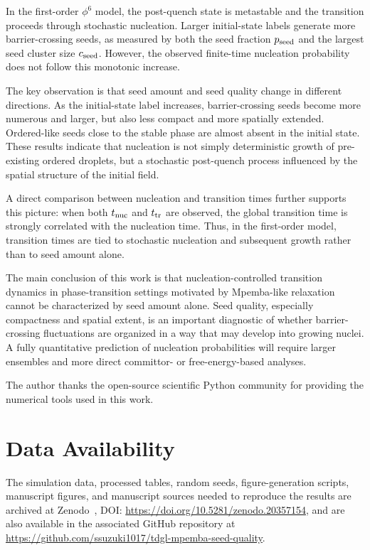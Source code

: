 ﻿\documentclass[aps,pre,preprint,showkeys,amsmath,amssymb,superscriptaddress,longbibliography]{revtex4-2}
\begin{document}
In the first-order $\phi^6$ model, the post-quench state is metastable and the transition proceeds through stochastic nucleation. Larger initial-state labels generate more barrier-crossing seeds, as measured by both the seed fraction $p_{\rm seed}$ and the largest seed cluster size $c_{\rm seed}$. However, the observed finite-time nucleation probability does not follow this monotonic increase.

The key observation is that seed amount and seed quality change in different directions. As the initial-state label increases, barrier-crossing seeds become more numerous and larger, but also less compact and more spatially extended. Ordered-like seeds close to the stable phase are almost absent in the initial state. These results indicate that nucleation is not simply deterministic growth of pre-existing ordered droplets, but a stochastic post-quench process influenced by the spatial structure of the initial field.

A direct comparison between nucleation and transition times further supports this picture: when both $t_{\rm nuc}$ and $t_{\rm tr}$ are observed, the global transition time is strongly correlated with the nucleation time. Thus, in the first-order model, transition times are tied to stochastic nucleation and subsequent growth rather than to seed amount alone.

The main conclusion of this work is that nucleation-controlled transition dynamics in phase-transition settings motivated by Mpemba-like relaxation cannot be characterized by seed amount alone. Seed quality, especially compactness and spatial extent, is an important diagnostic of whether barrier-crossing fluctuations are organized in a way that may develop into growing nuclei. A fully quantitative prediction of nucleation probabilities will require larger ensembles and more direct committor- or free-energy-based analyses.

\begin{acknowledgments}
The author thanks the open-source scientific Python community for providing the numerical tools used in this work.
\end{acknowledgments}

\section*{Data Availability}
The simulation data, processed tables, random seeds, figure-generation scripts, manuscript figures, and manuscript sources needed to reproduce the results are archived at Zenodo~\cite{SuzukiZenodo2026}, DOI: \url{https://doi.org/10.5281/zenodo.20357154}, and are also available in the associated GitHub repository at \url{https://github.com/ssuzuki1017/tdgl-mpemba-seed-quality}.



\end{document}
